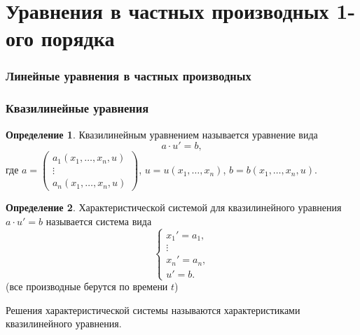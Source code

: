 \documentclass[a5paper, 10pt]{article}
\theoremstyle{definition}
\newtheorem{Def}{Определение}
\theoremstyle{plain}
\theoremstyle{remark}
\begin{document}
    \part{Уравнения в частных производных 1-ого порядка}
    \section{Линейные уравнения в частных производных}

    \section{Квазилинейные уравнения}
    \begin{Def}
        Квазилинейным уравнением называется уравнение вида
        \[
        a\cdot u' = b,
        \] где $a=\begin{pmatrix} a_1(x_1, \dots, x_n, u)\\  \vdots  \\ a_n(x_1, \dots, x_n, u)\end{pmatrix}$, $u=u(x_1, \dots, x_n)$, $b=b(x_1, \dots, x_n, u)$.
    \end{Def}
    \begin{Def}
        Характеристической системой для квазилинейного уравнения $a\cdot u'=b$ называется система вида
        \[
       \begin{cases}
           x_1' = a_1,\\
           \vdots\\
           x_n' = a_n,\\
           u' = b.
       \end{cases}
        \] 
        (все производные берутся по времени $t$)

        Решения характеристической системы называются характеристиками квазилинейного уравнения.
    \end{Def}
\end{document}
